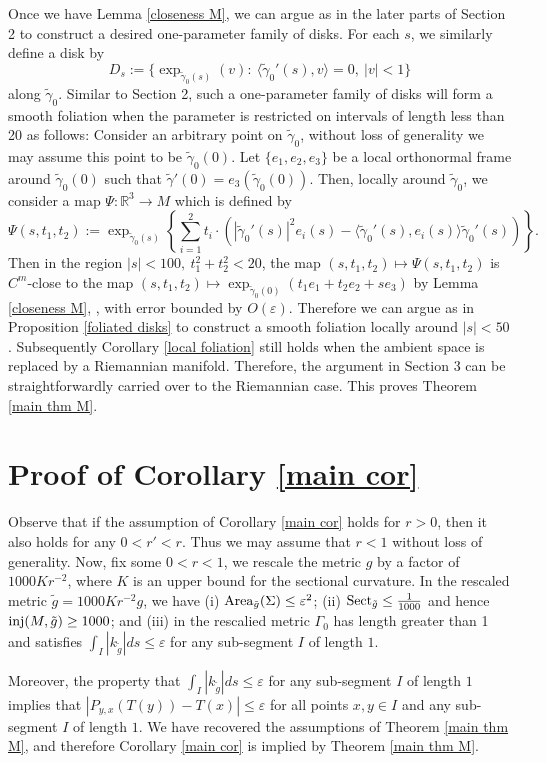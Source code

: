 \documentclass[a4paper, reqno]{amsart}
\theoremstyle{definition}
\theoremstyle{remark}
\numberwithin{equation}{section}
\newcommand{\inj}{\textup{inj}}
\numberwithin{equation}{section}
\numberwithin{equation}{section}
\begin{document}
\bigskip

Once we have Lemma \ref{closeness M}, we can argue as in the later parts of Section 2 to construct a desired one-parameter family of disks. For each $s$, we similarly define a disk by 
\[ D_s := \{\exp_{\tilde{\gamma}_0(s)}(v) :\ \langle \tilde{\gamma}_0'(s), v\rangle = 0,\ |v|< 1\}\]
along $\tilde{\gamma}_0$. Similar to Section 2, such a one-parameter family of disks will form a smooth foliation when the parameter is restricted on intervals of length less than 20 as follows: Consider an arbitrary point on $\tilde{\gamma}_0$, without loss of generality we may assume this point to be $\tilde{\gamma}_0(0)$. Let $\{e_1, e_2, e_3\}$ be a local orthonormal frame around $\tilde{\gamma}_0(0)$ such that $\tilde{\gamma}'(0) = e_3(\tilde{\gamma}_0(0))$. Then, locally around $\tilde{\gamma}_0$, we consider a map $\Psi:\mathbb{R}^3\to M$ which is defined by
 \[\Psi (s, t_1, t_2) := \exp_{\tilde{\gamma}_0(s)}\left\{ \sum_{i=1}^2 t_i\cdot \left(|\tilde{\gamma}_0'(s)|^2 e_i(s) - \langle\tilde{\gamma}_0'(s), e_i(s)\rangle\tilde{\gamma}_0'(s)\right)\right\}.\]
 Then in the region $|s|< 100,\ t_1^2 + t_2^2<20$, the map $(s, t_1, t_2)\mapsto \Psi(s, t_1, t_2)$ is $C^m$-close to the map $(s, t_1, t_2)\mapsto\exp_{\tilde{\gamma}_0(0)}(t_1e_1 + t_2e_2 + se_3)$ by Lemma \ref{closeness M}, , with error bounded by $O(\varepsilon)$. Therefore we can argue as in Proposition \ref{foliated disks} to construct a smooth foliation locally around $|s|<50$. Subsequently Corollary \ref{local foliation} still holds when the ambient space is replaced by a Riemannian manifold. Therefore, the argument in Section 3 can be straightforwardly carried over to the Riemannian case. This proves Theorem \ref{main thm M}.
 
 
 \bigskip
 
 
 \section{Proof of Corollary \ref{main cor}}{\label{appendix b}}
 
 Observe that if the assumption of Corollary \ref{main cor} holds for $r>0$, then it also holds for any $0<r'<r$. Thus we may assume that $r<1$ without loss of generality. Now, fix some $0<r<1$, we rescale the metric $g$ by a factor of $1000Kr^{-2}$, where $K$ is an upper bound for the sectional curvature. In the rescaled metric $\tilde{g} = 1000Kr^{-2}g$, we have (i) $\textup{Area}_{\tilde{g}}(\Sigma)\leq \varepsilon^2$; (ii) $\textup{Sect}_{\tilde{g}}\leq\frac{1}{1000}$ and hence $\inj(M, \tilde{g})\geq 1000$; and (iii) in the rescalied metric $\Gamma_0$ has length greater than 1 and satisfies $\int_I|k_{\tilde{g}}|ds\leq\varepsilon$ for any sub-segment $I$ of length $1$.
 
 Moreover, the property that $\int_I|k_{\tilde{g}}|ds\leq\varepsilon$ for any sub-segment $I$ of length $1$ implies that $|P_{y,x}(T(y)) - T(x)| \leq\varepsilon$ for all points $x, y\in I$ and any sub-segment $I$ of length $1$. We have recovered the assumptions of Theorem \ref{main thm M}, and therefore Corollary \ref{main cor} is implied by Theorem \ref{main thm M}.
 
 




\end{document}
